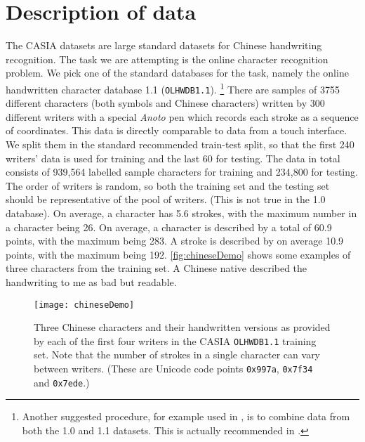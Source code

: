 \section{Description of data}
The CASIA datasets \cite{CASIA} are large standard datasets for Chinese handwriting recognition. The task we are attempting is the online character recognition problem. We pick one of the standard databases for the task, namely the online handwritten character database 1.1 (\verb|OLHWDB1.1|).%
\footnote{Another suggested procedure, for example used in \cite{BengioChinese1}, is to combine data from both the 1.0 and 1.1 datasets. This is actually recommended in \cite{CASIA}.}
There are samples of 3755 different characters (both symbols and Chinese characters) written by 300 different writers with a special \emph{Anoto} pen which records each stroke as a sequence of coordinates. 
This data is directly comparable to data from a touch interface.
We split them in the standard recommended train-test split, so that the first 240 writers' data is used for training and the last 60 for testing. The data in total consists of 939,564 labelled sample characters for training and 234,800 for testing. The order of writers is random, so both the training set and the testing set should be representative of the pool of writers. (This is not true in the 1.0 database).
On average, a character has 5.6 strokes, with the maximum number in a character being 26. On average, a character is described by a total of 60.9 points, with the maximum being 283. A stroke is described by on average 10.9 points, with the maximum being 192.
\autoref{fig:chineseDemo} shows some examples of three characters from the training set. A Chinese native described the handwriting to me as bad but readable.
\begin{figure}
\centering
  \texttt{[image: chineseDemo]}
  \caption[Example Chinese characters from the CASIA \texttt{OLHWDB1.1} training set.]{Three Chinese characters and their handwritten versions as provided by each of the first four writers in the CASIA \texttt{OLHWDB1.1} training set. Note that the number of strokes in a single character can vary between writers. (These are Unicode code points \texttt{0x997a}, \texttt{0x7f34} and \texttt{0x7ede}.) }
  \label{fig:chineseDemo}
\end{figure}

